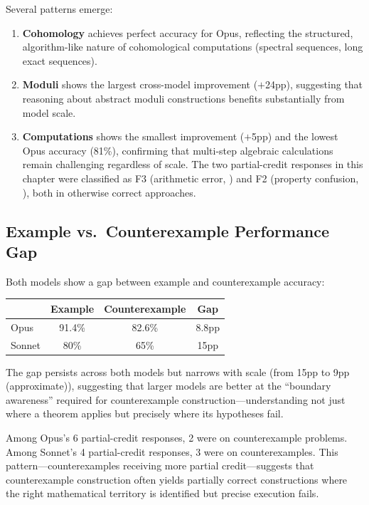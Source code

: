 Several patterns emerge:
\begin{enumerate}[nosep]
  \item \textbf{Cohomology} achieves perfect accuracy for Opus, reflecting the structured, algorithm-like nature of cohomological computations (spectral sequences, long exact sequences).
  \item \textbf{Moduli} shows the largest cross-model improvement ($+$24pp), suggesting that reasoning about abstract moduli constructions benefits substantially from model scale.
  \item \textbf{Computations} shows the smallest improvement ($+$5pp) and the lowest Opus accuracy (81\%), confirming that multi-step algebraic calculations remain challenging regardless of scale.
  The two partial-credit responses in this chapter were classified as F3 (arithmetic error, ) and F2 (property confusion, ), both in otherwise correct approaches.
\end{enumerate}

\subsection{Example vs.\ Counterexample Performance Gap}
\label{sec:gap-analysis}

Both models show a gap between example and counterexample accuracy:

\begin{center}
\begin{tabular}{lccc}
\toprule
& \textbf{Example} & \textbf{Counterexample} & \textbf{Gap} \\
\midrule
Opus & 91.4\% & 82.6\% & 8.8pp \\
Sonnet & 80\% & 65\% & 15pp \\
\bottomrule
\end{tabular}
\end{center}

The gap persists across both models but narrows with scale (from 15pp to 9pp (approximate)), suggesting that larger models are better at the ``boundary awareness'' required for counterexample construction---understanding not just where a theorem applies but precisely where its hypotheses fail.

Among Opus's 6 partial-credit responses, 2 were on counterexample problems.
Among Sonnet's 4 partial-credit responses, 3 were on counterexamples.
This pattern---counterexamples receiving more partial credit---suggests that counterexample construction often yields partially correct constructions where the right mathematical territory is identified but precise execution fails.

